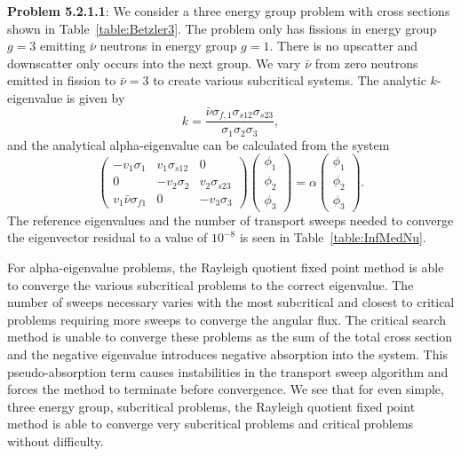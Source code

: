 \textbf{Problem 5.2.1.1}: We consider a three energy group problem with cross sections shown in Table~\ref{table:Betzler3}. The problem only has fissions in energy group $g = 3$ emitting $\bar{\nu}$ neutrons in energy group $g = 1$. There is no upscatter and downscatter only occurs into the next group. We vary $\bar{\nu}$ from zero neutrons emitted in fission to $\bar{\nu} = 3$ to create various subcritical systems. The analytic $k$-eigenvalue is given by
\begin{equation}
	k = \frac{\bar{\nu} \sigma_{f,1} \sigma_{s12} \sigma_{s23}}{\sigma_{1} \sigma_{2} \sigma_{3}},
\end{equation}
and the analytical alpha-eigenvalue can be calculated from the system
\begin{equation}
	\begin{pmatrix}
		-v_{1} \sigma_{1} & v_{1} \sigma_{s12} & 0 \\
		0 & -v_{2} \sigma_{2} & v_{2} \sigma_{s23} \\
		v_{1} \bar{\nu} \sigma_{f1} & 0 & -v_{3} \sigma_{3}
	\end{pmatrix}
	\begin{pmatrix}
		\phi_{1} \\ \phi_{2} \\ \phi_{3}
	\end{pmatrix} = 
	\alpha
	\begin{pmatrix}
		\phi_{1} \\ \phi_{2} \\ \phi_{3}
	\end{pmatrix}.
\end{equation}
The reference eigenvalues and the number of transport sweeps needed to converge the eigenvector residual to a value of $10^{-8}$ is seen in Table~\ref{table:InfMedNu}. 

For alpha-eigenvalue problems, the Rayleigh quotient fixed point method is able to converge the various subcritical problems to the correct eigenvalue. The number of sweeps necessary varies with the most subcritical and closest to critical problems requiring more sweeps to converge the angular flux. The critical search method is unable to converge these problems as the sum of the total cross section and the negative eigenvalue introduces negative absorption into the system. This pseudo-absorption term causes instabilities in the transport sweep algorithm and forces the method to terminate before convergence. We see that for even simple, three energy group, subcritical problems, the Rayleigh quotient fixed point method is able to converge very subcritical problems and critical problems without difficulty.

